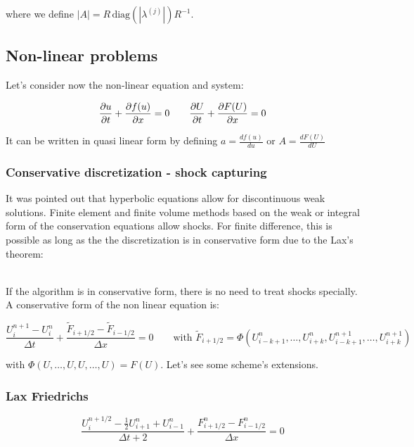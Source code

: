 where we define $|A| = R \, \mbox{diag}(|\lambda ^{(j)}|) R^{-1}$.

\subsection{Non-linear problems}
Let's consider now the non-linear equation and system: 

\begin{equation}
\frac{\partial u}{\partial t}  +\frac{\partial f(u)}{\partial x}=0 \qquad \frac{\partial U}{\partial t}  +\frac{\partial F(U)}{\partial x} = 0
\end{equation}

It can be written in quasi linear form by defining $a = \frac{d f(u)}{du}$ or $A = \frac{d F(U)}{dU}$

\subsubsection{Conservative discretization - shock capturing}
It was pointed out that hyperbolic equations allow for discontinuous weak solutions. Finite element and finite volume methods based on the weak or integral form of the conservation equations allow shocks. For finite difference, this is possible as long as the the discretization is in conservative form due to the Lax's theorem: 

\ \\

If the algorithm is in conservative form, there is no need to treat shocks specially. A conservative form of the non linear equation is: 

\begin{equation}
\frac{U_i^{n+1}-U_i^{n}}{\Delta t} + \frac{\tilde{F}_{i+1/2}-\tilde{F}_{i-1/2}}{\Delta x}= 0 \qquad \mbox{with } \tilde{F}_{i+1/2} = \Phi (U_{i-k+1}^n,\dots , U_{i+k}^n, U_{i-k+1}^{n+1}, \dots , U_{i+k}^{n+1})
\end{equation}

with $\Phi (U, \dots , U, U , \dots , U) = F(U)$. Let's see some scheme's extensions. 

\subsubsection{Lax Friedrichs}

\begin{equation}
\frac{U_i^{n+1/2}-\frac{1}{2}U_{i+1}^n+U_{i-1}^n}{\Delta t+2} + \frac{F_{i+1/2}^n-F^n_{i-1/2}}{\Delta x}=0 
\end{equation}

